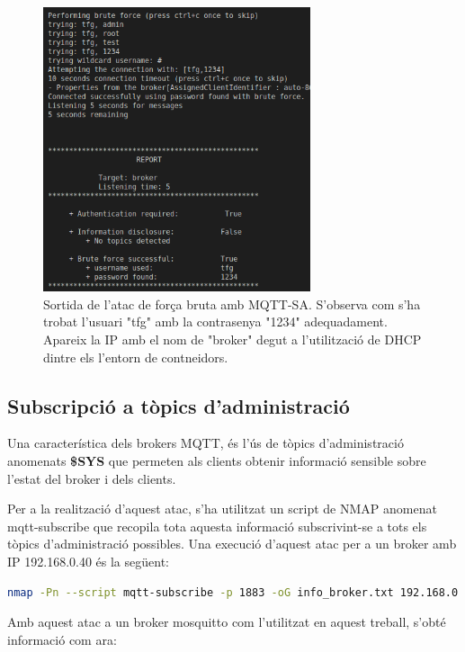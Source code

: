 \begin{figure}[H]
    \centering
    \includegraphics[width=0.7\textwidth]{img/mqttsa.png}
    \caption{Sortida de l'atac de força bruta amb MQTT-SA. S'observa com s'ha trobat l'usuari "tfg" amb la contrasenya "1234" adequadament. Apareix la IP amb el nom de "broker" degut a l'utilització de DHCP dintre els l'entorn de contneidors.}
    \label{fig:MqttsaBruteforce}
\end{figure}

\subsection{Subscripció a tòpics d'administració}

Una característica dels brokers MQTT, és l'ús de tòpics d'administració anomenats \textbf{\$SYS} que permeten als clients obtenir informació sensible sobre l'estat del broker i dels clients.

Per a la realització d'aquest atac, s'ha utilitzat un script de NMAP anomenat mqtt-subscribe que recopila tota aquesta informació subscrivint-se a tots els tòpics d'administració possibles. 
Una execució d'aquest atac per a un broker amb IP 192.168.0.40 és la següent:

\begin{lstlisting}[language=bash, caption={NSE script Nmap}, label=lst:NmapScript]
    nmap -Pn --script mqtt-subscribe -p 1883 -oG info_broker.txt 192.168.0.40
\end{lstlisting}

Amb aquest atac a un broker mosquitto com l'utilitzat en aquest treball, s'obté informació com ara:

